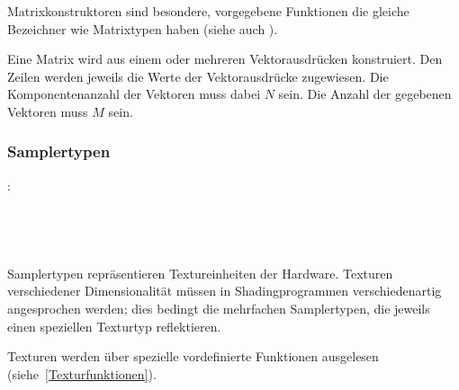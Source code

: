 Matrixkonstruktoren sind besondere, vorgegebene Funktionen die gleiche Bezeichner wie Matrixtypen haben
(siehe auch ).


Eine Matrix wird aus einem oder mehreren Vektorausdrücken konstruiert. Den Zeilen werden
jeweils die Werte der Vektorausdrücke zugewiesen. Die Komponentenanzahl der Vektoren muss dabei
$N$ sein. Die Anzahl der gegebenen Vektoren muss $M$ sein.


\subsubsection{Samplertypen}\label{Samplertypen}
:\label{typ_sampler}\\
\hspace*{1cm}\glq{}\grq \\
\hspace*{1cm}\glq{}\grq \\
\hspace*{1cm}\glq{}\grq \\
\hspace*{1cm}\glq{}\grq \\

Samplertypen repräsentieren Textureinheiten der Hardware. Texturen verschiedener
Dimensionalität müssen in Shadingprogrammen verschiedenartig angesprochen werden;
dies bedingt die mehrfachen Samplertypen, die jeweils einen speziellen Texturtyp
reflektieren.

Texturen werden über spezielle vordefinierte Funktionen ausgelesen (siehe~\ref{Texturfunktionen}).


